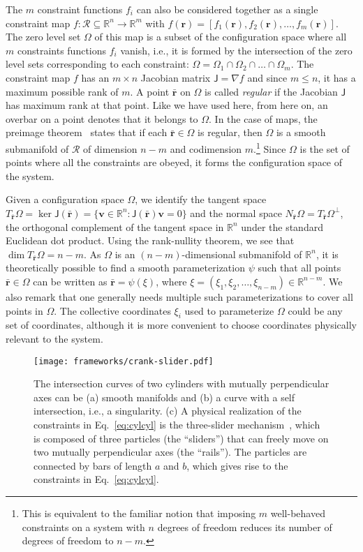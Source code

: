 The $m$ constraint functions $f_i$ can also be considered together as a single constraint map $f: \mathscr{R} \subseteq \mathbb{R}^n \to \mathbb{R}^m$ with $f(\bm{r}) = [f_1(\bm{r}), f_2(\bm{r}), \dots, f_m(\bm{r})]$.
The zero level set $\Omega$ of this map is a subset of the configuration space where all $m$ constraints functions $f_i$ vanish, i.e., it is formed by the intersection of the zero level sets corresponding to each constraint: $\Omega = \Omega_1 \cap \Omega_2 \cap \dots \cap \Omega_m$.
The constraint map $f$ has an $m\times n$ Jacobian matrix $\mathsf{J} = \nabla f$ and since $m\leq n$, it has a maximum possible rank of $m$.
A point $\bar{\bm{r}}$ on $\Omega$ is called \emph{regular} if the Jacobian $\mathsf{J}$ has maximum rank at that point.
Like we have used here, from here on, an overbar on a point denotes that it belongs to $\Omega$.
In the case of maps, the preimage theorem~\cite{lee2013} states that if each $\bar{\bm{r}} \in \Omega$ is regular, then $\Omega$ is a smooth submanifold of $\mathscr{R}$ of dimension $n - m$ and codimension $m$.\footnote{This is equivalent to the familiar notion that imposing $m$ well-behaved constraints on a system with $n$ degrees of freedom reduces its number of degrees of freedom to $n-m$.}
Since $\Omega$ is the set of points where all the constraints are obeyed, it forms the configuration space of the system.

Given a configuration space $\Omega$, we identify the tangent space $T_{\bar{\bm{r}}}\Omega = \ker{\mathsf{J}(\bar{\bm{r}})} = \{\bm{v} \in \mathbb{R}^n: \mathsf{J}(\bar{\bm{r}})\bm{v} = 0\}$ and the normal space $N_{\bar{\bm{r}}}\Omega = T_{\bar{\bm{r}}}\Omega^\perp$, the orthogonal complement of the tangent space in $\mathbb{R}^n$ under the standard Euclidean dot product.
Using the rank-nullity theorem, we see that $\dim T_{\bar{\bm{r}}}\Omega = n-m$.
As $\Omega$ is an $(n-m)$-dimensional submanifold of $\mathbb{R}^n$, it is theoretically possible to find a smooth parameterization $\psi$ such that all points $\bar{\bm{r}} \in \Omega$ can be written as $\bar{\bm{r}} = \psi(\xi)$, where $\xi = (\xi_1, \xi_2, \ldots, \xi_{n-m}) \in \mathbb{R}^{n-m}$.
We also remark that one generally needs multiple such parameterizations to cover all points in $\Omega$.
The collective coordinates $\xi_i$ used to parameterize $\Omega$ could be any set of coordinates, although it is more convenient to choose coordinates physically relevant to the system.
%
\begin{figure}
  \begin{center}
    \texttt{[image: frameworks/crank-slider.pdf]}
  \end{center}
  \caption{The intersection curves of two cylinders with mutually perpendicular axes can be (a) smooth manifolds and (b) a curve with a self intersection, i.e., a singularity. (c) A physical realization of the constraints in Eq.~\eqref{eq:cylcyl} is the three-slider mechanism~\cite{bohigas2019}, which is composed of three particles (the ``sliders'') that can freely move on two mutually perpendicular axes (the ``rails'').
    The particles are connected by bars of length $a$ and $b$, which gives rise to the constraints in Eq.~\eqref{eq:cylcyl}.
  }
  \label{fig:slider}
\end{figure}

